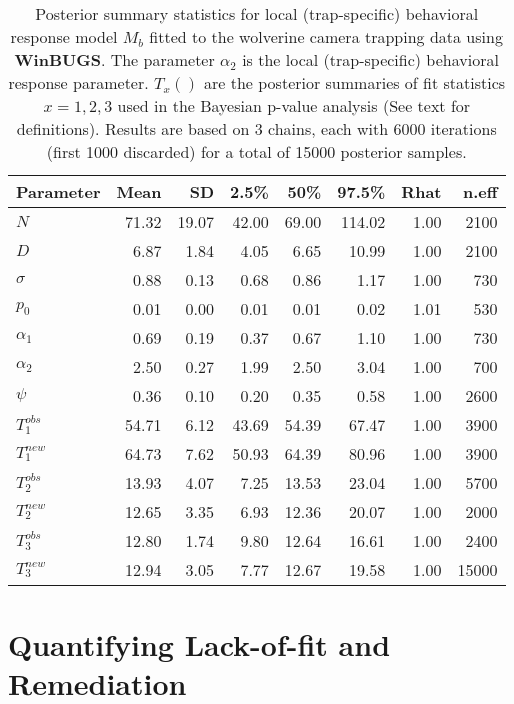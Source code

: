 \begin{table}[ht]
\centering
\caption{
Posterior summary statistics for local (trap-specific) behavioral
response model $M_{b}$ fitted to the wolverine camera trapping data
using {\bf WinBUGS}. The parameter $\alpha_{2}$ is the local
(trap-specific) behavioral
response parameter. $T_{x}()$ are the posterior summaries of fit
statistics $x=1,2,3$ used in the Bayesian p-value analysis (See text for
definitions). Results are based on
 3 chains, each with 6000 iterations (first 1000 discarded) for a
 total of 15000 posterior samples. 
}
\begin{tabular}{lrrrrrrr} \hline \hline 
Parameter   & Mean  & SD  & 2.5\% & 50\% & 97.5\% & Rhat &n.eff \\ \hline
$N$          & 71.32 &19.07 &42.00 &69.00 &114.02 &1.00  &2100 \\
$D$          &  6.87 & 1.84 & 4.05 & 6.65 & 10.99 &1.00  &2100\\ \hline
$\sigma$    &  0.88 & 0.13 & 0.68 & 0.86 & 1.17  &1.00  & 730 \\
$p_0$        &  0.01 & 0.00 & 0.01 & 0.01 & 0.02  &1.01  & 530\\
$\alpha_1$   &  0.69 & 0.19 & 0.37 & 0.67 &  1.10 &1.00  & 730\\
$\alpha_2$   &  2.50 & 0.27 & 1.99 & 2.50 &  3.04 &1.00  & 700\\
$\psi$       &  0.36 & 0.10 & 0.20 & 0.35 & 0.58  &1.00  &2600  \\
$T_{1}^{obs}$  & 54.71 & 6.12 &43.69 &54.39 & 67.47 &1.00  &3900\\
$T_{1}^{new}$  & 64.73 & 7.62 &50.93 &64.39 & 80.96 &1.00  &3900\\
$T_{2}^{obs}$  & 13.93 & 4.07 & 7.25 &13.53 & 23.04 &1.00  &5700\\
$T_{2}^{new}$  & 12.65 & 3.35 & 6.93 &12.36 & 20.07 &1.00  &2000\\
$T_{3}^{obs}$  & 12.80 & 1.74 & 9.80 &12.64 & 16.61 &1.00  &2400\\
$T_{3}^{new}$  & 12.94 & 3.05 & 7.77 &12.67 & 19.58 &1.00 &15000\\ \hline
\end{tabular}
\label{gof.tab.wolvMb}
\end{table}

\section{Quantifying Lack-of-fit and Remediation}

